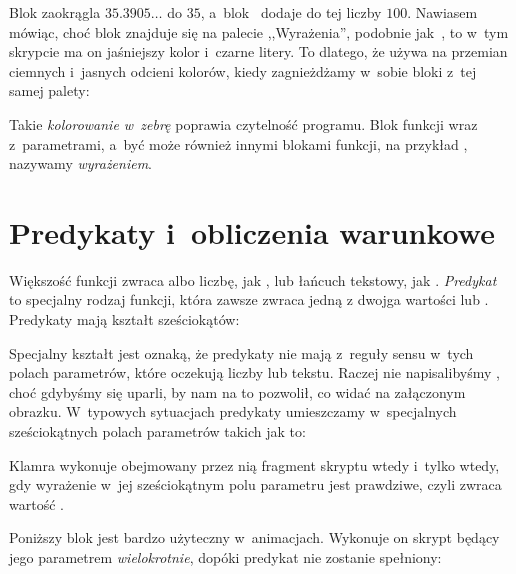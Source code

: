 \documentclass[a4paper]{report}
\begin{document}
Blok  zaokrągla $35.3905\ldots$ do $35$, a~blok~\code{+} dodaje do tej liczby $100$. Nawiasem mówiąc, choć blok  znajduje się na palecie ,,Wyrażenia'', podobnie jak~\code{+}, to w~tym skrypcie ma on jaśniejszy kolor i~czarne litery. To dlatego, że \Snap{} używa na przemian ciemnych i~jasnych odcieni kolorów, kiedy zagnieżdżamy w~sobie bloki z~tej samej palety:\nopagebreak


Takie \emph{kolorowanie w~zebrę} poprawia czytelność programu. Blok funkcji wraz z~parametrami, a~być może również innymi blokami funkcji, na przykład , nazywamy \emph{wyrażeniem}.

\section{Predykaty i~obliczenia warunkowe}

Większość funkcji zwraca albo liczbę, jak , lub łańcuch tekstowy, jak . \emph{Predykat} to specjalny rodzaj funkcji, która zawsze zwraca jedną z dwojga wartości  lub . Predykaty mają kształt sześciokątów:\nopagebreak


\begin{sloppypar}
Specjalny kształt jest oznaką, że predykaty nie mają z~reguły sensu w~tych polach parametrów, które oczekują liczby lub tekstu. Raczej nie napisalibyśmy , choć gdybyśmy się uparli, \Snap{} by nam na to pozwolił, co widać na załączonym obrazku. W~typowych sytuacjach predykaty umieszczamy w~specjalnych sześciokątnych polach parametrów takich jak to:\nopagebreak
\end{sloppypar}


Klamra  wykonuje obejmowany przez nią fragment skryptu wtedy i~tylko wtedy, gdy wyrażenie w~jej sześciokątnym polu parametru jest prawdziwe, czyli zwraca wartość .\nopagebreak


Poniższy blok jest bardzo użyteczny w~animacjach. Wykonuje on skrypt będący jego parametrem \emph{wielokrotnie}, dopóki predykat nie zostanie spełniony:\nopagebreak
\end{document}
